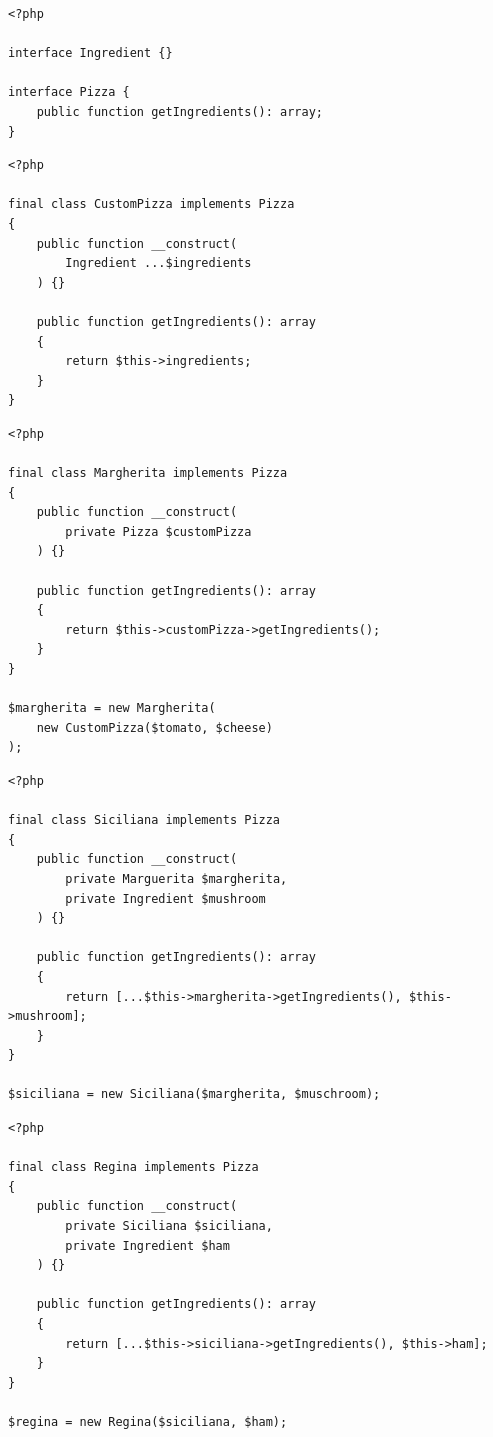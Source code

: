 \begin{frame}[fragile,c]
    \begin{lstlisting}
<?php

interface Ingredient {}

interface Pizza {
    public function getIngredients(): array;
}
    \end{lstlisting}
\end{frame}

\begin{frame}[fragile,c]
    \begin{lstlisting}
<?php

final class CustomPizza implements Pizza
{
    public function __construct(
        Ingredient ...$ingredients
    ) {}

    public function getIngredients(): array
    {
        return $this->ingredients;
    }
}
    \end{lstlisting}
\end{frame}

\begin{frame}[fragile,c]
    \begin{lstlisting}
<?php

final class Margherita implements Pizza
{
    public function __construct(
        private Pizza $customPizza
    ) {}

    public function getIngredients(): array
    {
        return $this->customPizza->getIngredients();
    }
}

$margherita = new Margherita(
    new CustomPizza($tomato, $cheese)
);
    \end{lstlisting}
\end{frame}

\begin{frame}[fragile,c]
    \begin{lstlisting}
<?php

final class Siciliana implements Pizza
{
    public function __construct(
        private Marguerita $margherita,
        private Ingredient $mushroom
    ) {}

    public function getIngredients(): array
    {
        return [...$this->margherita->getIngredients(), $this->mushroom];
    }
}

$siciliana = new Siciliana($margherita, $muschroom);
    \end{lstlisting}
\end{frame}

\begin{frame}[fragile,c]
    \begin{lstlisting}
<?php

final class Regina implements Pizza
{
    public function __construct(
        private Siciliana $siciliana,
        private Ingredient $ham
    ) {}

    public function getIngredients(): array
    {
        return [...$this->siciliana->getIngredients(), $this->ham];
    }
}

$regina = new Regina($siciliana, $ham);
    \end{lstlisting}
\end{frame}

